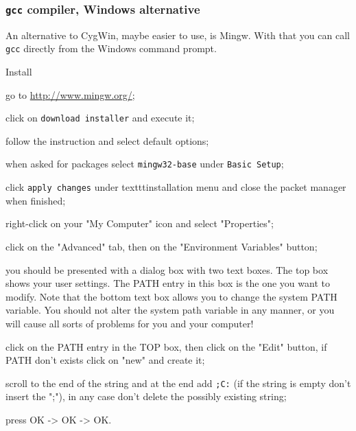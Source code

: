 \begin{frame}
  \frametitle{\texttt{gcc} compiler, Windows alternative}
  An alternative to CygWin, maybe easier to use, is \alert{Mingw}. With that you can call \texttt{gcc} directly from the Windows command prompt.
  \begin{block}{Install}
  \item go to \alert{\url{http://www.mingw.org/}};
  \item click on \alert{\texttt{download installer}} and execute it;
  \item follow the instruction and select default options;
  \item when asked for packages select \alert{\texttt{mingw32-base}} under \texttt{Basic Setup};
  \item click \alert{\texttt{apply changes}} under \alert{texttt{installation}} menu and close the packet manager when finished;
  \item right-click on your "My Computer" icon and select "Properties";
  \item click on the "Advanced" tab, then on the "Environment Variables" button;
  \item you should be presented with a dialog box with two text boxes. The top box shows your user settings. The PATH entry in this box is the one you want to modify. Note that the bottom text box allows you to change the system PATH variable. You should not alter the system path variable in any manner, or you will cause all sorts of problems for you and your computer!
  \item click on the PATH entry in the TOP box, then click on the "Edit" button, if PATH don't exists click on "new" and create it;
  \item scroll to the end of the string and at the end add \alert{\texttt{;C:\MinGW\bin}} (if the string is empty don't insert the ";"), in any case don't delete the possibly existing string;
  \item press OK -> OK -> OK.
  \end{block}
\end{frame}

